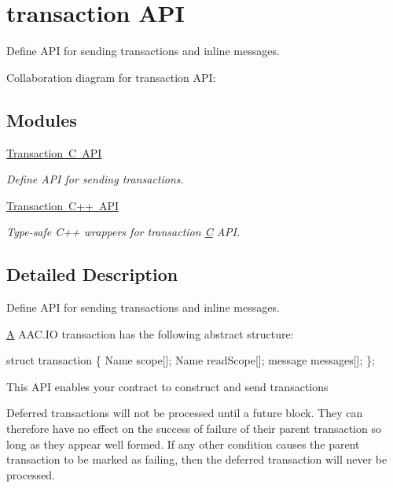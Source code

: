 \hypertarget{group__transactionapi}{}\section{transaction A\+PI}
\label{group__transactionapi}


Define A\+PI for sending transactions and inline messages.  


Collaboration diagram for transaction A\+PI\+:
\subsection*{Modules}
\begin{DoxyCompactItemize}
\item 
\mbox{\hyperlink{group__transactioncapi}{Transaction C A\+PI}}
\begin{DoxyCompactList}\small\item\em Define A\+PI for sending transactions. \end{DoxyCompactList}\item 
\mbox{\hyperlink{group__transactioncppapi}{Transaction C++ A\+PI}}
\begin{DoxyCompactList}\small\item\em Type-\/safe C++ wrappers for transaction \mbox{\hyperlink{struct_c}{C}} A\+PI. \end{DoxyCompactList}\end{DoxyCompactItemize}


\subsection{Detailed Description}
Define A\+PI for sending transactions and inline messages. 

\mbox{\hyperlink{struct_a}{A}} A\+A\+C.\+IO transaction has the following abstract structure\+:


\begin{DoxyCode}
\textcolor{keyword}{struct }transaction \{
  Name scope[]; 
  Name readScope[]; 
  message messages[]; 
\};
\end{DoxyCode}


This A\+PI enables your contract to construct and send transactions

Deferred transactions will not be processed until a future block. They can therefore have no effect on the success of failure of their parent transaction so long as they appear well formed. If any other condition causes the parent transaction to be marked as failing, then the deferred transaction will never be processed.

